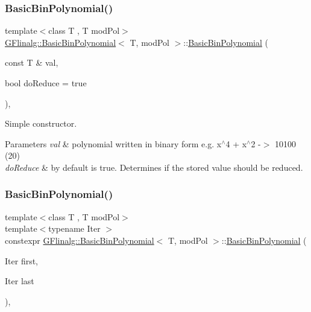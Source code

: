 \subsubsection{\texorpdfstring{BasicBinPolynomial()}{BasicBinPolynomial()}\hspace{0.1cm}{\footnotesize\ttfamily [1/2]}}
{\footnotesize\ttfamily template$<$class T , T mod\+Pol$>$ \\
\mbox{\hyperlink{class_g_flinalg_1_1_basic_bin_polynomial}{G\+Flinalg\+::\+Basic\+Bin\+Polynomial}}$<$ T, mod\+Pol $>$\+::\mbox{\hyperlink{class_g_flinalg_1_1_basic_bin_polynomial}{Basic\+Bin\+Polynomial}} (\begin{DoxyParamCaption}\item[{const T \&}]{val,  }\item[{bool}]{do\+Reduce = {\ttfamily true} }\end{DoxyParamCaption})\hspace{0.3cm}{\ttfamily [inline]}, {\ttfamily [explicit]}}



Simple constructor. 


\begin{DoxyParams}{Parameters}
{\em val} & polynomial written in binary form e.\+g. x$^\wedge$4 + x$^\wedge$2 -\/$>$ 10100 (20) \\
\hline
{\em do\+Reduce} & by default is true. Determines if the stored value should be reduced. \\
\hline
\end{DoxyParams}
\mbox{\label{class_g_flinalg_1_1_basic_bin_polynomial_a24dfc872ab484815b9d38558d13ac074}} 
\subsubsection{\texorpdfstring{BasicBinPolynomial()}{BasicBinPolynomial()}\hspace{0.1cm}{\footnotesize\ttfamily [2/2]}}
{\footnotesize\ttfamily template$<$class T , T mod\+Pol$>$ \\
template$<$typename Iter $>$ \\
constexpr \mbox{\hyperlink{class_g_flinalg_1_1_basic_bin_polynomial}{G\+Flinalg\+::\+Basic\+Bin\+Polynomial}}$<$ T, mod\+Pol $>$\+::\mbox{\hyperlink{class_g_flinalg_1_1_basic_bin_polynomial}{Basic\+Bin\+Polynomial}} (\begin{DoxyParamCaption}\item[{Iter}]{first,  }\item[{Iter}]{last }\end{DoxyParamCaption})\hspace{0.3cm}{\ttfamily [inline]}, {\ttfamily [explicit]}}



